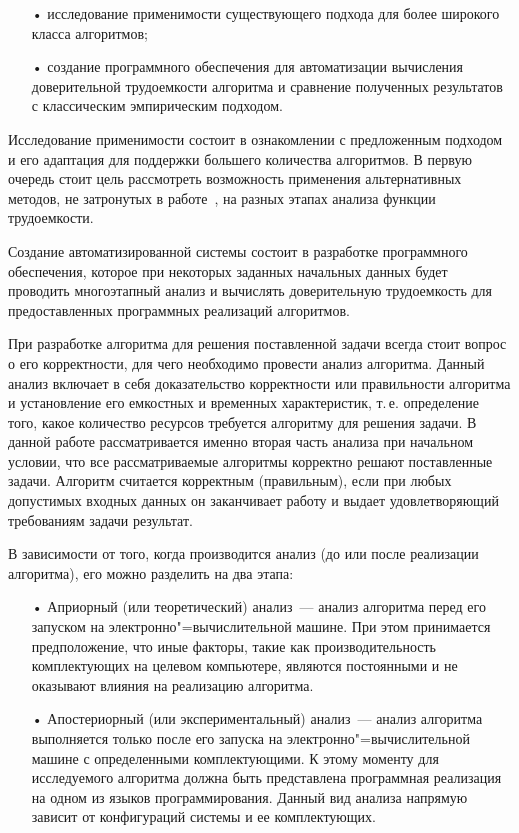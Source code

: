 \documentclass[a4paper, article, 14pt]{extarticle}
\begin{document}
\begin{enumerate}
	\item[•] исследование применимости существующего подхода для более широкого класса алгоритмов;

	\item[•] создание программного обеспечения для автоматизации вычисления доверительной трудоемкости алгоритма и сравнение полученных результатов с классическим эмпирическим подходом.
\end{enumerate}

Исследование применимости состоит в ознакомлении с предложенным подходом и его адаптация для поддержки большего количества алгоритмов. В первую очередь стоит цель рассмотреть возможность применения альтернативных методов, не затронутых в работе~\cite{petrushyn_ulyanov_analysis}, на разных этапах анализа функции трудоемкости.

Создание автоматизированной системы состоит в разработке программного обеспечения, которое при некоторых заданных начальных данных будет проводить многоэтапный анализ и вычислять доверительную трудоемкость для предоставленных программных реализаций алгоритмов.

\label{sec:literature_review}

При разработке алгоритма для решения поставленной задачи всегда стоит вопрос о его корректности, для чего необходимо провести анализ алгоритма. Данный анализ включает в себя доказательство корректности или правильности алгоритма и установление его емкостных и временных характеристик, т.\,е. определение того, какое количество ресурсов требуется алгоритму для решения задачи. В данной работе рассматривается именно вторая часть анализа при начальном условии, что все рассматриваемые алгоритмы корректно решают поставленные задачи. Алгоритм считается корректным (правильным), если при любых допустимых входных данных он заканчивает работу и выдает удовлетворяющий требованиям задачи результат.

В зависимости от того, когда производится анализ (до или после реализации алгоритма), его можно разделить на два этапа:

\begin{enumerate}
	\item[•] Априорный (или теоретический) анализ~--- анализ алгоритма перед его запуском на электронно"=вычислительной машине. При этом принимается предположение, что иные факторы, такие как производительность комплектующих на целевом компьютере, являются постоянными и не оказывают влияния на реализацию алгоритма.

	\item[•] Апостериорный (или экспериментальный) анализ~--- анализ алгоритма выполняется только после его запуска на электронно"=вычислительной машине с определенными комплектующими. К этому моменту для исследуемого алгоритма должна быть представлена программная реализация на одном из языков программирования. Данный вид анализа напрямую зависит от конфигураций системы и ее комплектующих.
\end{enumerate}
\end{document}
